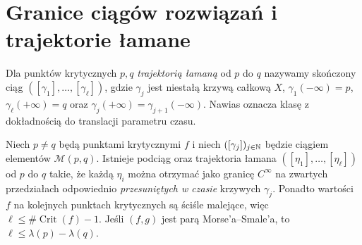 \section{Granice ciągów rozwiązań i trajektorie łamane}
\begin{definicja}
\label{def:broken-morse-v11}
Dla punktów krytycznych $p,q$ \emph{trajektorią łamaną}
od $p$ do $q$ nazywamy skończony ciąg
$([\gamma_1],\ldots,[\gamma_\ell])$,
gdzie $\gamma_j$ jest niestałą krzywą całkową $X$,
$\gamma_1(-\infty)=p$, $\gamma_\ell(+\infty)=q$ oraz
$\gamma_j(+\infty)=\gamma_{j+1}(-\infty)$.
Nawias oznacza klasę z dokładnością do translacji parametru czasu.
\end{definicja}

\begin{twierdzenie}
\label{thm:morse-broken-compact-v11}
Niech $p\ne q$ będą punktami krytycznymi $f$ i niech
$([\gamma_j])_{j\in\mathbb{N}}$ będzie ciągiem elementów
$\mathcal M(p,q)$.
Istnieje podciąg oraz trajektoria łamana
$([\eta_1],\ldots,[\eta_\ell])$ od $p$ do $q$ takie, że
każdą $\eta_i$ można otrzymać jako granicę $C^\infty$
na zwartych przedziałach odpowiednio \emph{przesuniętych w czasie}
krzywych $\gamma_j$. Ponadto wartości $f$ na kolejnych
punktach krytycznych są ściśle malejące, więc
$\ell\le\#\operatorname{Crit}(f)-1$.
Jeśli $(f,g)$ jest parą Morse'a--Smale'a, to
$\ell\le\lambda(p)-\lambda(q)$.
\end{twierdzenie}
